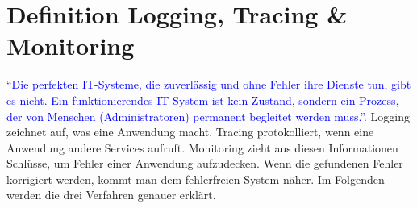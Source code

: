 \chapter{Definition Logging, Tracing {\selectfont \&} Monitoring}\label{ch:definition-von-logging-tracing-&-monitoring}
\textcolor{blue}{
    \enquote{Die perfekten IT-Systeme, die zuverlässig und ohne Fehler ihre Dienste tun, gibt es nicht. Ein funktionierendes IT-System ist kein Zustand, sondern ein Prozess, der von Menschen (Administratoren) permanent begleitet werden muss.}}\autocite{cloudradar}.
Logging zeichnet auf, was eine Anwendung macht.
Tracing protokolliert, wenn eine Anwendung andere Services aufruft.
Monitoring zieht aus diesen Informationen Schlüsse, um Fehler einer Anwendung aufzudecken.
Wenn die gefundenen Fehler korrigiert werden, kommt man dem fehlerfreien System näher.
Im Folgenden werden die drei Verfahren genauer erklärt.


